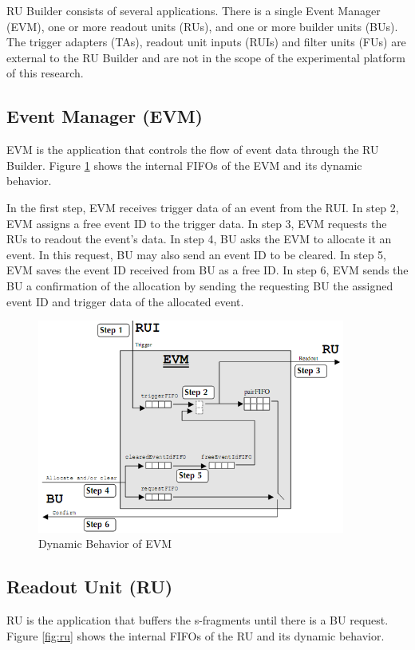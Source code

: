 RU Builder consists of several applications. There is a single Event Manager (EVM), one or more readout units (RUs), and one or more builder units (BUs). The trigger adapters (TAs), readout unit inputs (RUIs) and filter units (FUs) are external to the RU Builder and are not in the scope of the experimental platform of this research. 

\subsection{Event Manager (EVM)}
EVM is the application that controls the flow of event data through the RU Builder. Figure \ref{fig:evm} shows the internal FIFOs of the EVM and its dynamic behavior.

In the first step, EVM receives trigger data of an event from the RUI. In step 2, EVM assigns a free event ID to the trigger data. In step 3, EVM requests the RUs to readout the event's data. In step 4, BU asks the EVM to allocate it an event. In this request, BU may also send an event ID to be cleared. In step 5, EVM saves the event ID received from BU as a free ID. In step 6, EVM sends the BU a confirmation of the allocation by sending the requesting BU the assigned event ID and trigger data of the allocated event. \cite{rubuilder}

\begin{figure}
	\centering
		\includegraphics[width=0.90\textwidth]{figures/evm.png}
	\caption{Dynamic Behavior of EVM}
	\label{fig:evm}
\end{figure}

\subsection{Readout Unit (RU)}
RU is the application that buffers the s-fragments until there is a BU request. Figure \ref{fig:ru} shows the internal FIFOs of the RU and its dynamic behavior.

